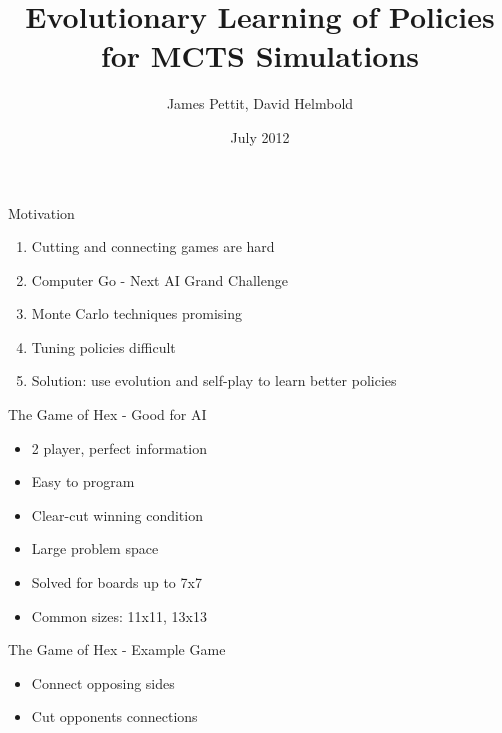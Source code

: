 \documentclass{beamer}
\title[Learning MCTS]{Evolutionary Learning of Policies for MCTS Simulations}
\author[Pettit, Helmbold]{James Pettit, David Helmbold}
\institute[UCSC]{
  University of California, Santa Cruz\\
  \texttt{jpettit@soe.ucsc.edu}
}
\date[July 2012]{July 2012}
\begin{document}
\begin{frame}[plain]
  \titlepage
\end{frame}

\begin{frame}{Motivation}
\begin{enumerate}
	\item Cutting and connecting games are hard
	\item Computer Go - Next AI Grand Challenge
	\item Monte Carlo techniques promising
	\item Tuning policies difficult
	\item Solution: use evolution and self-play to learn better policies 
\end{enumerate}
\end{frame}

\begin{frame}{The Game of Hex - Good for AI}
	\begin{figure}[tb]
	\resizebox{3.3in}{!}{ \begin{HexBoard}[board size=7]
		  \HGame{}
		\end{HexBoard}
		}
	\end{figure}
	\begin{itemize}
		\item 2 player, perfect information
		\item Easy to program
		\item Clear-cut winning condition
		\item Large problem space
		\item Solved for boards up to 7x7
		\item Common sizes: 11x11, 13x13
	\end{itemize}
\end{frame}

\begin{frame}{The Game of Hex - Example Game}
	\begin{figure}[tb]
	\end{figure}
	\begin{itemize}
		\item Connect opposing sides
		\item Cut opponents connections
	\end{itemize}
\end{frame}
\end{document}
